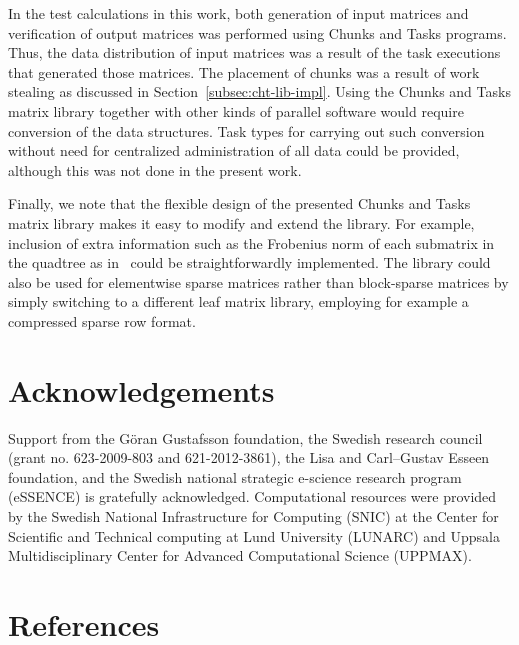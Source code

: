 \documentclass{elsarticle}
\begin{document}
In the test calculations in this work, both generation of input
matrices and verification of output matrices was performed using
Chunks and Tasks programs. Thus, the data distribution of input
matrices was a result of the task executions that generated those
matrices. The placement of chunks was a result of work stealing as
discussed in Section~\ref{subsec:cht-lib-impl}. Using the Chunks and
Tasks matrix library together with other kinds of parallel software
would require conversion of the data structures. Task types for
carrying out such conversion without need for centralized administration
of all data could be provided, although this was not done in the
present work.

 

Finally, we note that the flexible design of the presented Chunks and
Tasks matrix library makes it easy to modify and extend the
library. For example, inclusion of extra information such as the
Frobenius norm of each submatrix in the quadtree as
in~\cite{BockChallacombeSISC2013} could be straightforwardly
implemented. The library could also be used for elementwise sparse
matrices rather than block-sparse matrices by simply switching to a
different leaf matrix library, employing for example a compressed
sparse row format.








\section*{Acknowledgements}

Support from the G{\"o}ran Gustafsson foundation, the Swedish research
council (grant no. 623-2009-803 and 621-2012-3861), the Lisa and
Carl--Gustav Esseen foundation, and the Swedish national strategic
e-science research program (eSSENCE) is gratefully acknowledged.
Computational resources were provided by the Swedish National
Infrastructure for Computing (SNIC) at the Center for Scientific and
Technical computing at Lund University (LUNARC) and Uppsala
Multidisciplinary Center for Advanced Computational Science (UPPMAX).


\section*{References}


\end{document}
